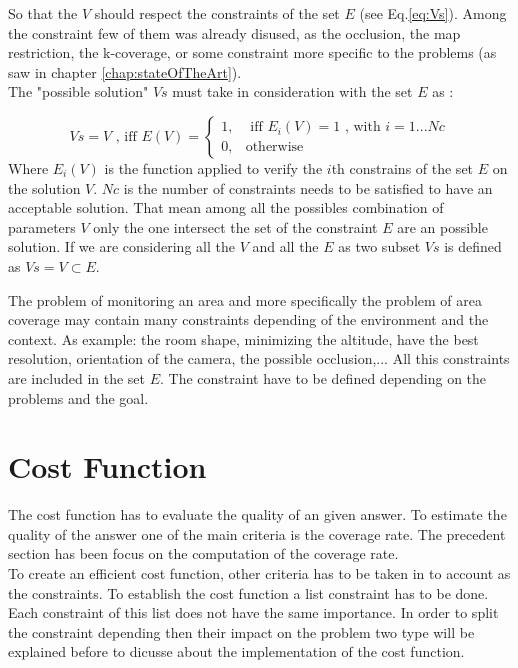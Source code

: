 So that the $V$ should respect the constraints of the set $E$ (see Eq.\ref{eq:Vs}). Among the constraint few of them was already disused, as the occlusion, the map restriction, the k-coverage, or some constraint more specific to the problems (as saw in chapter \ref{chap:stateOfTheArt}).\\
 The "possible solution" $Vs$ must take in consideration with the set $E$ as :

\begin{equation}\label{eq:Vs}
Vs=V \mbox{ , iff } E(V)=\begin{cases}1, & \mbox{  iff } E_i(V)=1 \mbox{ , with } i=1...Nc \\ 0, & \mbox{otherwise} 
\end{cases} 
\end{equation}
Where $E_i(V)$ is the function applied to verify  the $i$th constrains of the set $E$ on the solution $V$. $Nc$ is the number of constraints needs to be satisfied to have an acceptable solution.
That mean among all the possibles combination of parameters $V$ only the one intersect the set of the constraint $E$ are an possible solution.  If we are considering  all the $V$ and all the $E$ as two subset $Vs$ is defined as $Vs=V\subset E$. 

The problem of monitoring an area and more specifically the problem of area coverage may contain many constraints depending of the environment and the context. As example: the room shape, minimizing  the altitude,  have the best resolution, orientation of the camera, the possible occlusion,... All this constraints are included in the set $E$. 
The constraint have to be defined depending on the problems and the goal.
\section{Cost Function}
The cost function has to evaluate the quality of an given answer. To estimate the quality of the answer  one of the main criteria is the coverage rate. The precedent section has been focus on the computation of the coverage rate. \\
To create an efficient cost function, other criteria has to be taken in to account as the constraints.  
 To establish the cost function a list constraint has to be done. Each constraint of this list does not have the same importance. In order to split the constraint depending then their impact on the problem two type will be  explained before to dicusse about the implementation  of the cost function. 

